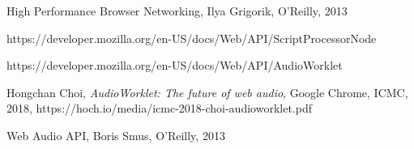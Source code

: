 \documentclass[11pt, a4paper, twoside]{article}
\begin{document}
\begin{thebibliography}{9}

  High Performance Browser Networking,
  Ilya Grigorik,
  O'Reilly,
  2013
  
  https://developer.mozilla.org/en-US/docs/Web/API/ScriptProcessorNode

https://developer.mozilla.org/en-US/docs/Web/API/AudioWorklet

  Hongchan Choi,
    \textit{AudioWorklet: The future of web audio},
    Google Chrome,
    ICMC,
    2018,
    https://hoch.io/media/icmc-2018-choi-audioworklet.pdf

    Web Audio API,
    Boris Smus,
    O'Reilly,
    2013
    
\end{thebibliography}
\end{document}
